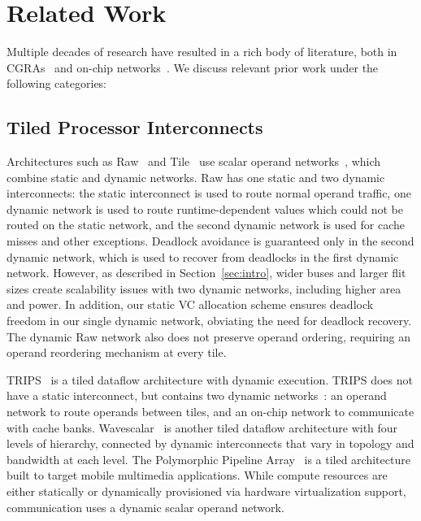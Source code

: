 \section{Related Work}
\label{sec:related}
Multiple decades of research have resulted in a rich body of literature, both in CGRAs~\cite{cgraSurvey1, cgraSurvey2} and on-chip networks~\cite{ocn-synthesis}. We discuss relevant prior work under the following categories:
\subsection{Tiled Processor Interconnects} Architectures such as Raw~\cite{raw} and Tile~\cite{tile} use scalar operand networks~\cite{son}, which combine static and dynamic networks. Raw has one static and two dynamic interconnects: the static interconnect is used to route normal operand traffic, one dynamic network is used to route runtime-dependent values which could not be routed on the static network, and the second dynamic network is used for cache misses and other exceptions. Deadlock avoidance is guaranteed only in the second dynamic network, which is used to recover from deadlocks in the first dynamic network. However, as described in Section~\ref{sec:intro}, wider buses and larger flit sizes create scalability issues with two dynamic networks, including higher area and power. In addition, our static VC allocation scheme ensures deadlock freedom in our single dynamic network, obviating the need for deadlock recovery.
The dynamic Raw network also does not preserve operand ordering, requiring an operand reordering mechanism at every tile.

TRIPS~\cite{trips} is a tiled dataflow architecture with dynamic execution. TRIPS does not have a static interconnect, but contains two dynamic networks~\cite{trips-network}: an operand network  to route operands between tiles, and an on-chip network  to communicate with cache banks. Wavescalar~\cite{wavescalar} is another tiled dataflow architecture with four levels of hierarchy, connected by dynamic interconnects that vary in topology and bandwidth at each level. The Polymorphic Pipeline Array~\cite{ppa} is a tiled architecture built to target mobile multimedia applications. While compute resources are either statically or dynamically provisioned via hardware virtualization support, communication uses a dynamic scalar operand network.

